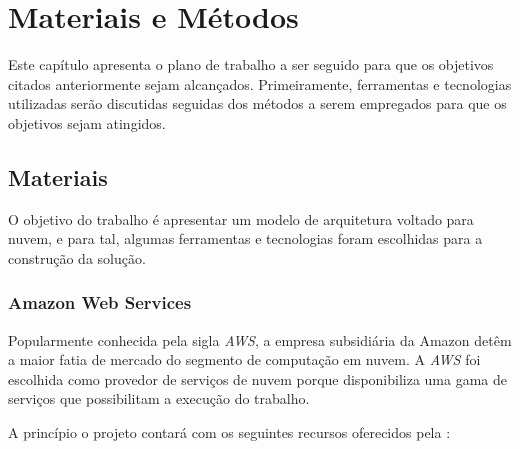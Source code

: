 
\chapter{Materiais e Métodos}\label{cap:materiaisemetodos}


Este capítulo apresenta o plano de trabalho a ser seguido para que os objetivos citados
anteriormente sejam alcançados. Primeiramente, ferramentas e tecnologias utilizadas serão discutidas seguidas dos métodos a serem empregados para que os objetivos sejam atingidos.

\section{Materiais}\label{sec:materiais}

O objetivo do trabalho é apresentar um modelo de arquitetura voltado para nuvem, e para tal, algumas ferramentas e tecnologias foram escolhidas para a construção da solução.

\subsection{Amazon Web Services}\label{subsec:amazonWebServices}

Popularmente conhecida pela sigla \textit{AWS}, a empresa subsidiária da Amazon detêm a maior fatia de mercado do segmento de computação em nuvem. A \textit{AWS} foi escolhida como provedor de serviços de nuvem porque disponibiliza uma gama de serviços que possibilitam a execução do trabalho.

A princípio o projeto contará com os seguintes recursos oferecidos pela \citet{awsconceitosbasicos}: 


